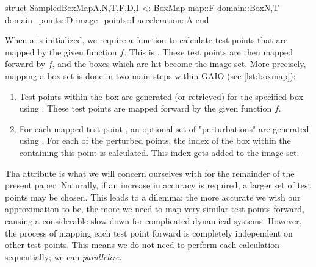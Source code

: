 \begin{jllisting}[language=julia, style=jlcodestyle]
    struct SampledBoxMap{A,N,T,F,D,I} <: BoxMap
        map::F
        domain::Box{N,T}
        domain_points::D
        image_points::I
        acceleration::A
    end
\end{jllisting}

When a  is initialized, we require a function to calculate test 
points that are mapped by the given function $f$. This is . These test 
points are then mapped forward by $f$, and the boxes which are hit become the image set.
More precisely, mapping a box set is done in two main steps within GAIO (see 
\autoref{lst:boxmap}):

\begin{enumerate}
    \item Test points within the box are generated (or retrieved) for the specified box 
    using . These test points are mapped 
    forward by the given function $f$.
    \item For each mapped test point , an optional set of "perturbations" are 
    generated using . For each of the perturbed points, 
    the index of the box within the  containing this point is calculated. 
    This index gets added to the image set. \\
\end{enumerate}

Tha  attribute is what we will concern ourselves with for the remainder 
of the present paper. Naturally, if an increase in accuracy is required, a larger set of 
test points may be chosen. This leads to a dilemma: the more accurate we wish our 
approximation  to be, the more we need to map very similar test points forward,
causing a considerable slow down for complicated dynamical systems. However, the process of
mapping each test point forward is completely independent on other test points. This means 
we do not need to perform each calculation sequentially; we can \emph{parallelize}. 

